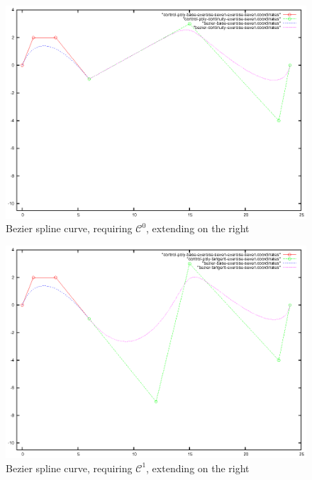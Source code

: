\documentclass{article}
\begin{document}
\begin{figure}[h!]
  \centering
  \includegraphics{bezier-deCasteljau-curves/exercise-seven-continuity}
  \caption{Bezier spline curve, requiring $\mathcal{C}^0$, extending on the right}
  \label{fig:bezier-spline-right-extension-continuity}
\end{figure}

\begin{figure}[h!]
  \centering
  \includegraphics{bezier-deCasteljau-curves/exercise-seven-tangent}
  \caption{Bezier spline curve, requiring $\mathcal{C}^1$, extending on the right}
  \label{fig:bezier-spline-right-extension-tangent}
\end{figure}
\end{document}
